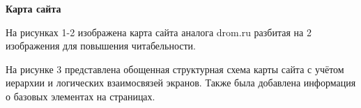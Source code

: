 \textbf{Карта сайта}
\bigskip

На рисунках 1-2 изображена карта сайта аналога drom.ru разбитая на 2 изображения для повышения читабельности.
\bigskip

\noindent
\begin{minipage}{\linewidth}
\end{minipage}
\bigskip

\noindent
\begin{minipage}{\linewidth}
\end{minipage}
\bigskip

На рисунке 3 представлена обощенная структурная схема карты сайта с учётом иерархии и логических взаимосвязей экранов. Также была добавлена информация о базовых элементах на страницах.

\noindent
\begin{minipage}{\linewidth}
\end{minipage}
\bigskip

